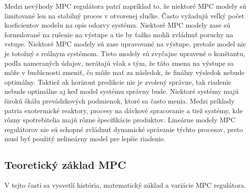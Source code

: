 \indent Medzi nevýhody MPC regulátora patrí napríklad to, že niektoré MPC modely sú limitované len na stabilný proces v otvorenej slučke. Často vyžadujú veľký počet koeficientov modelu na opis odozvy systému. Niektoré MPC modely zase sú formulované na  rušenie na výstupe a tie by ťažko mohli zvládnuť poruchy na vstupe. Niektoré MPC modely sú zase upravované na výstupe, pretože model nie je totožný s reálnym systémom. Tieto modely sú zvyčajne upravené o konštantu, podľa nameraných údajov, nerátajú však s tým, že táto zmena na výstupe sa môže v budúcnosti zmeniť, čo môže mať za následok, že finálny výsledok nebude optimálny. Taktiež ak horizont predikcie nie je zvolený správne, tak riadenie nebude optimálne aj keď model systému správny bude. Niektoré systémy majú širokú škálu prevádzkových podmienok, ktoré sa často menia. Medzi príklady patria exotermické reaktory, procesy na dávkové spracovanie a tiež systémy, kde rôzny spotrebitelia majú rôzne špecifikácie produktov. Lineárne modely MPC regulátorov nie sú schopné zvládnuť dynamické správanie týchto procesov, preto musí byť použitý nelineárny model pre lepšie riadenie.\cite{MPC02} 
\subsection{Teoretický základ MPC}
V tejto časti sa vysvetlí história, matematický základ a variácie MPC regulátora.
